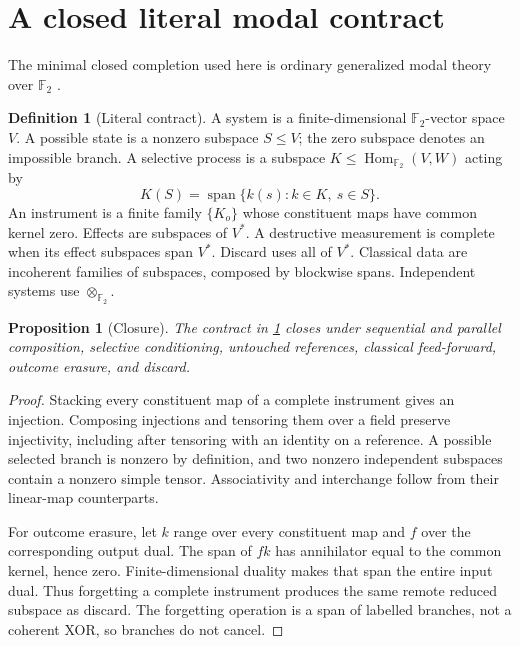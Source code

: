\documentclass[11pt]{article}
\newtheorem{proposition}[theorem]{Proposition}
\theoremstyle{definition}
\newtheorem{definition}[theorem]{Definition}
\theoremstyle{remark}
\newcommand{\F}{\mathbb F_2}
\newcommand{\Span}{\operatorname{span}}
\begin{document}
\section{A closed literal modal contract}

The minimal closed completion used here is ordinary generalized modal theory over $\F$ \cite{SW12}.

\begin{definition}[Literal contract]\label{def:literal}
A system is a finite-dimensional $\F$-vector space $V$. A possible state is a nonzero subspace $S\le V$; the zero subspace denotes an impossible branch. A selective process is a subspace $K\le\operatorname{Hom}_{\F}(V,W)$ acting by
\[
  K(S)=\Span\{k(s):k\in K,\ s\in S\}.
\]
An instrument is a finite family $\{K_o\}$ whose constituent maps have common kernel zero. Effects are subspaces of $V^*$. A destructive measurement is complete when its effect subspaces span $V^*$. Discard uses all of $V^*$. Classical data are incoherent families of subspaces, composed by blockwise spans. Independent systems use $\otimes_{\F}$.
\end{definition}

\begin{proposition}[Closure]\label{prop:closure}
The contract in \cref{def:literal} closes under sequential and parallel composition, selective conditioning, untouched references, classical feed-forward, outcome erasure, and discard.
\end{proposition}

\begin{proof}
Stacking every constituent map of a complete instrument gives an injection. Composing injections and tensoring them over a field preserve injectivity, including after tensoring with an identity on a reference. A possible selected branch is nonzero by definition, and two nonzero independent subspaces contain a nonzero simple tensor. Associativity and interchange follow from their linear-map counterparts.

For outcome erasure, let $k$ range over every constituent map and $f$ over the corresponding output dual. The span of $fk$ has annihilator equal to the common kernel, hence zero. Finite-dimensional duality makes that span the entire input dual. Thus forgetting a complete instrument produces the same remote reduced subspace as discard. The forgetting operation is a span of labelled branches, not a coherent XOR, so branches do not cancel.
\end{proof}
\end{document}
